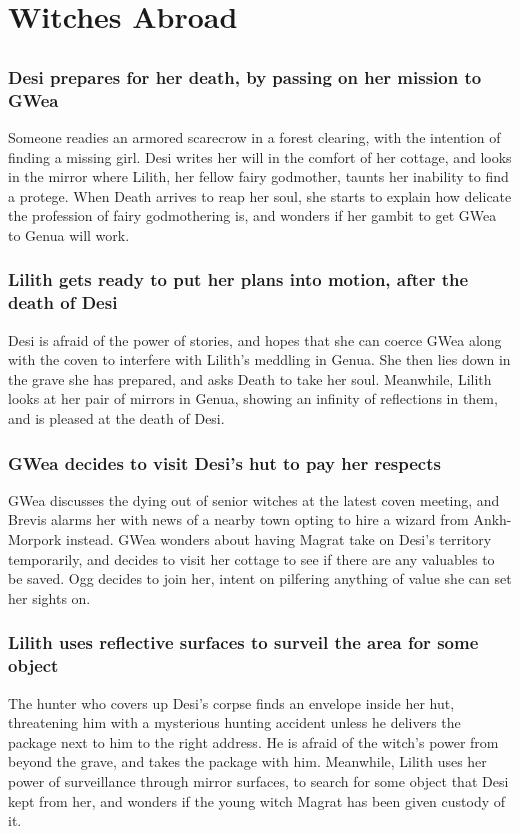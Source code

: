 \section{Witches Abroad}


\subsection{}
\subsubsection{\Gls{Desi} prepares for her death, by passing on her mission to \Gls{GWea}}
Someone readies an armored scarecrow in a forest clearing, with the intention of finding a missing
girl. \Gls{Desi} writes her will in the comfort of her cottage, and looks in the mirror where
\Gls{Lilith}, her fellow fairy godmother, taunts her inability to find a protege. When \Gls{Death}
arrives to reap her soul, she starts to explain how delicate the profession of fairy godmothering
is, and wonders if her gambit to get \Gls{GWea} to Genua will work.

\subsubsection{\Gls{Lilith} gets ready to put her plans into motion, after the death of \Gls{Desi}}
\Gls{Desi} is afraid of the power of stories, and hopes that she can coerce \Gls{GWea} along with
the coven to interfere with \Gls{Lilith}'s meddling in Genua. She then lies down in the grave she
has prepared, and asks \Gls{Death} to take her soul. Meanwhile, \Gls{Lilith} looks at her pair of
mirrors in Genua, showing an infinity of reflections in them, and is pleased at the death of
\Gls{Desi}.

\subsubsection{\Gls{GWea} decides to visit \Gls{Desi}'s hut to pay her respects}
\Gls{GWea} discusses the dying out of senior witches at the latest coven meeting, and \Gls{Brevis}
alarms her with news of a nearby town opting to hire a wizard from Ankh-Morpork instead. \Gls{GWea}
wonders about having \Gls{Magrat} take on \Gls{Desi}'s territory temporarily, and decides to visit
her cottage to see if there are any valuables to be saved. \Gls{Ogg} decides to join her, intent on
pilfering anything of value she can set her sights on.

\subsubsection{\Gls{Lilith} uses reflective surfaces to surveil the area for some object}
The hunter who covers up \Gls{Desi}'s corpse finds an envelope inside her hut, threatening him with
a mysterious hunting accident unless he delivers the package next to him to the right address. He is
afraid of the witch's power from beyond the grave, and takes the package with him. Meanwhile,
\Gls{Lilith} uses her power of surveillance through mirror surfaces, to search for some object that
\Gls{Desi} kept from her, and wonders if the young witch \Gls{Magrat} has been given custody of it.

